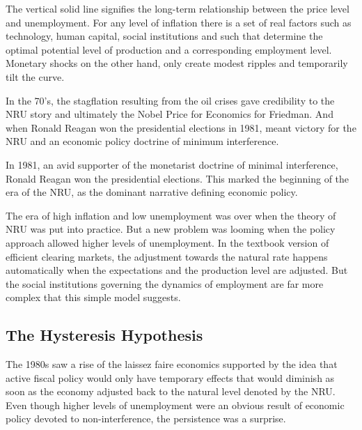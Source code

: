 \documentclass[12pt,a4paper,english]{article}
\begin{document}
The vertical solid line signifies the long-term relationship between the price level and unemployment. For any level of inflation there is a set of real factors such as technology, human capital, social institutions and such that determine the optimal potential level of production and a corresponding employment level. Monetary shocks on the other hand, only create modest ripples and temporarily tilt the curve.

In the 70's, the stagflation resulting from the oil crises gave credibility to the NRU story and ultimately the Nobel Price for Economics for Friedman. And when Ronald Reagan won the presidential elections in 1981, meant victory for the NRU and an economic policy doctrine of minimum interference.

In 1981, an avid supporter of the monetarist doctrine of minimal interference, Ronald Reagan won the presidential elections. This marked the beginning of the era of the NRU, as the dominant narrative defining economic policy.

The era of high inflation and low unemployment was over when the theory of NRU was put into practice. But a new problem was looming when the policy approach allowed higher levels of unemployment. In the textbook version of efficient clearing markets, the adjustment towards the natural rate happens automatically when the expectations and the production level are adjusted. But the social institutions governing the dynamics of employment are far more complex that this simple model suggests.

\vspace{2cm}

\subsection{The Hysteresis Hypothesis}


The 1980s saw a rise of the laissez faire economics supported by the idea that active fiscal policy would only have temporary effects that would diminish as soon as the economy adjusted back to the natural level denoted by the NRU. Even though higher levels of unemployment were an obvious result of economic policy devoted to non-interference, the persistence was a surprise. \citep{nelson2007}
\end{document}
